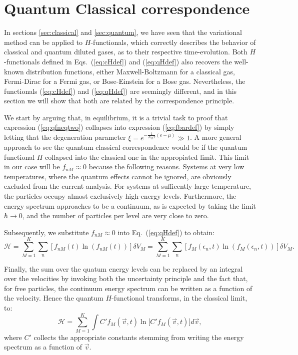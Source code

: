 

\section{Quantum Classical correspondence}\label{sec:qccorrespondence}

In sections \ref{sec:classical} and \ref{sec:quantum}, we have seen that the variational
method can be applied to $H$-functionals, which correctly describes the behavior of
classical and quantum diluted gases, as to their respective time-evolution.
Both $H$-functionals defined in Eqs.~(\ref{eq:cHdef}) and
(\ref{eq:qHdef}) also recovers the well-known distribution functions, either Maxwell-Boltzmann
for a classical gas, Fermi-Dirac for a Fermi gas, or Bose-Einstein for a Bose gas. Nevertheless,
the functionals (\ref{eq:cHdef}) and
(\ref{eq:qHdef}) are seemingly different, and in this section we will show that both are
related by the correspondence principle.

We start by arguing that, in equilibrium, it is a trivial task to proof that expression (\ref{eq:qfneqtwo}) collapses
into expression (\ref{eq:fbardef}) by simply letting that the 
degeneration parameter $\xi=e^{-\frac{1}{K_B T}(\epsilon-\mu)} \gg 1$.
A more general approach to see the quantum classical correspondence would be if the quantum functional 
$H$ collapsed  into the classical one in the appropiated limit.
This limit in our case will be $f_{nM} \approx 0$ because the following reasons.
Systems at very low temperatures, where the quantum effects cannot be ignored, are obviously excluded
from the current analysis. For systems at sufficently large temperature, the particles
occupy almost exclusively high-energy levels. 
Furthermore, the energy spectrum approaches to be a continuum, as is expected by taking the limit
$\hbar\to0$, and the number of particles per level are very close to zero.

Subsequently, we substitute $f_{nM}\approx0$ into Eq.~(\ref{eq:qHdef}) to obtain:
%
\begin{equation}\label{h-quantic2}
    \mathcal{H}= \sum_{M=1}^{K} \sum_n
    \left[ f_{nM}(t)\ln \left(f_{nM}(t)\right)\right] \delta V_M
    =\sum_{M=1}^{K} \sum_n
    \left[ f_{M}(\epsilon_n,t) \ln \left( f_{M}(\epsilon_n,t)\right)\right] \delta V_M.
\end{equation}
%

Finally, the sum over the quatum energy levels can be replaced by an integral over the velocities
by invoking both the uncertainty principle and the fact that, for free particles, the continuum
energy spectrum
can be written as a function of the velocity. Hence the quantum $H$-functional
transforms, in the classical limit, to:
%
\begin{equation}\label{eq:qHclassLim}
    \mathcal{H}= \sum_{M=1}^{K}\int C'f_M(\vec v,t)\ln\big[C' f_M(\vec v,t)\big] d\vec v,
\end{equation}
%
where $C'$ collects the appropriate constants stemming from writing the energy spectrum as
a function of $\vec v$.






